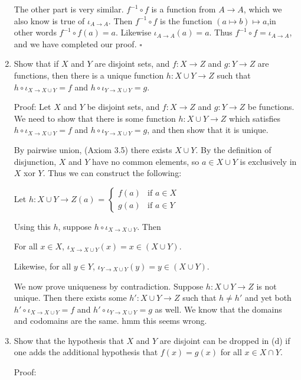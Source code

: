 \documentclass{assignment}
\newenvironment{q}
    {\begin{bfseries}}
    {\end{bfseries}}
\newenvironment{xx}
    {\color{red}}
    {}
\begin{document}
\begin{enumerate}
    The other part is very similar. $f^{-1} \circ f$ is a function from $A \to A$, which we also know is true of $\iota_{A \to A}$. Then $f^{-1} \circ f$ is the function $(a \mapsto b) \mapsto a$,in other words $f^{-1} \circ f(a)=a$. Likewise $\iota_{A \to A}(a)=a$. Thus $f^{-1} \circ f = \iota_{A \to A}$, and we have completed our proof.
    $\square$

    \item \begin{q}
        Show that if $X$ and $Y$ are disjoint sets, and $f: X \to Z$ and $g: Y \to Z$ are functions, then there is a unique function $h: X \cup Y \to Z$ such that $h \circ \iota_{X \to X \cup Y} = f$ and $h \circ \iota_{Y \to X \cup Y} = g.$
    \end{q}

    Proof:
    Let $X$ and $Y$ be disjoint sets, and $f: X \to Z$ and $g: Y \to Z$ be functions. 
    We need to show that there is some function $h: X \cup Y \to Z$ which satisfies $h \circ \iota_{X \to X \cup Y} = f$ and $h \circ \iota_{Y \to X \cup Y} = g$, and then show that it is unique.
    
    By pairwise union, (Axiom 3.5) there exists $X \cup Y$. By the definition of disjunction, $X$ and $Y$ have no common elements, so $a \in X \cup Y$ is exclusively in $X$ xor $Y$. Thus we can construct the following:
    
    Let $h: X \cup Y \to Z(a)$ = \(
        \begin{cases} 
            f(a) & \text{if } a \in X \\
            g(a) & \text{if } a \in Y
        \end{cases}
    \)
  
    
    \begin{xx}
        Using this $h$, suppose $h \circ \iota_{X \to X \cup Y}$. Then 
        
        For all $x \in X$, $\iota_{X \to X \cup Y}(x)=x \in (X \cup Y)$.
    
        Likewise, for all $y \in Y$, $\iota_{Y \to X \cup Y}(y)=y \in (X \cup Y)$.
    
        We now prove uniqueness by contradiction.
        Suppose $h: X \cup Y \to Z$ is not unique. 
        Then there exists some $h': X \cup Y \to Z$ such that $h \neq h'$ and yet both $h' \circ \iota_{X \to X \cup Y} = f$ and $h' \circ \iota_{Y \to X \cup Y} = g$ as well. 
        We know that the domains and codomains are the same.
        hmm this seems wrong.

    \end{xx}
    

    \item \begin{q}
        Show that the hypothesis that $X$ and $Y$ are disjoint can be dropped in (d) if one adds the additional hypothesis that $f(x) = g(x)$ for all $x \in X \cap Y$.
    \end{q}

    Proof:

\end{enumerate}
\end{document}
